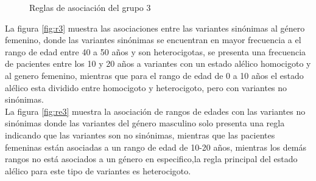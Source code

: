 \begin{figure}[h!]
	\centering
	\caption{Reglas de asociación del grupo 3}\label{fig:reglas3}
\end{figure}

La figura \ref{fig:r3} muestra las asociaciones entre las variantes sinónimas al género femenino, donde las variantes sinónimas se encuentran en mayor frecuencia a el rango de edad entre 40 a 50 años y son heterocigotas, se presenta una frecuencia de pacientes entre los 10 y 20 años a variantes con un estado alélico homocigoto y al genero femenino, mientras que para el rango de edad de 0 a 10 años el estado alélico esta dividido entre homocigoto y heterocigoto, pero con variantes no sinónimas. \\

La figura \ref{fig:re3} muestra la asociación de rangos de edades con las variantes no sinónimas donde las variantes del género masculino solo presenta una regla indicando que las variantes son no sinónimas, mientras que las pacientes femeninas están asociadas a un rango de edad de 10-20 años, mientras los demás rangos no está asociados a un género en especifico,la regla principal del estado alélico para este tipo de variantes es heterocigoto. \\

